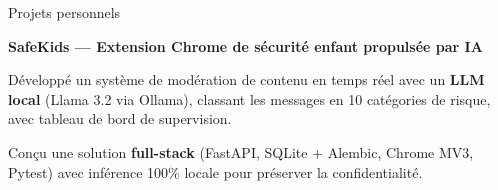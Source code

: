 
\begin{rubric}{Projets personnels}

\entry*[2024 -- Présent]
    \textbf{SafeKids — Extension Chrome de sécurité enfant propulsée par IA}
    \par Développé un système de modération de contenu en temps réel avec un \textbf{LLM local} (Llama 3.2 via Ollama), classant les messages en 10 catégories de risque, avec tableau de bord de supervision.
    \par Conçu une solution \textbf{full-stack} (FastAPI, SQLite + Alembic, Chrome MV3, Pytest) avec inférence 100\% locale pour préserver la confidentialité.

%

\end{rubric}
